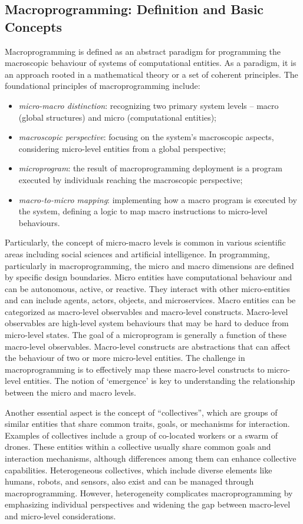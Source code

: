 \subsection{Macroprogramming: Definition and Basic Concepts}
\sloppy
Macroprogramming is defined as an abstract paradigm for programming the macroscopic behaviour of systems of computational entities. 
 As a paradigm, it is an approach rooted in a mathematical theory or a set of coherent principles. 
 The foundational principles of macroprogramming include: 
\begin{itemize}
    \item \emph{micro-macro distinction}: recognizing two primary system levels -- macro (global structures) and micro (computational entities);
    \item \emph{macroscopic perspective}: focusing on the system's macroscopic aspects, 
    considering micro-level entities from a global perspective;
    \item \emph{microprogram}: the result of macroprogramming deployment is a program executed by individuals reaching the macroscopic perspective;
    \item \emph{macro-to-micro mapping}: implementing how a macro program is executed by the system, 
    defining a logic to map macro instructions to micro-level behaviours.
\end{itemize}
Particularly, the concept of micro-macro levels is common in various scientific areas including social sciences and artificial intelligence. 
 In programming, particularly in macroprogramming, 
 the micro and macro dimensions are defined by specific design boundaries. 
 Micro entities have computational behaviour and can be autonomous, active, or reactive. 
 They interact with other micro-entities and can include agents, actors, objects, and microservices. 
 Macro entities can be categorized as macro-level observables and macro-level constructs. 
 Macro-level observables are high-level system behaviours that may be hard to deduce from micro-level states. 
 The goal of a microprogram is generally a function of these macro-level observables. 
 Macro-level constructs are abstractions that can affect the behaviour of two or more micro-level entities. 
 The challenge in macroprogramming is to effectively map these macro-level constructs to micro-level entities. 
 The notion of `emergence' is key to understanding the relationship between the micro and macro levels.

Another essential aspect is the concept of ``collectives'', 
 which are groups of similar entities that share common traits, goals, or mechanisms for interaction. Examples of collectives include a group of co-located workers or a swarm of drones. 
 These entities within a collective usually share common goals and interaction mechanisms, 
 although differences among them can enhance collective capabilities. 
 Heterogeneous collectives, which include diverse elements like humans, robots, and sensors, also exist and can be managed through macroprogramming. 
 However, heterogeneity complicates macroprogramming by emphasizing individual perspectives and widening the gap between macro-level and micro-level considerations.

